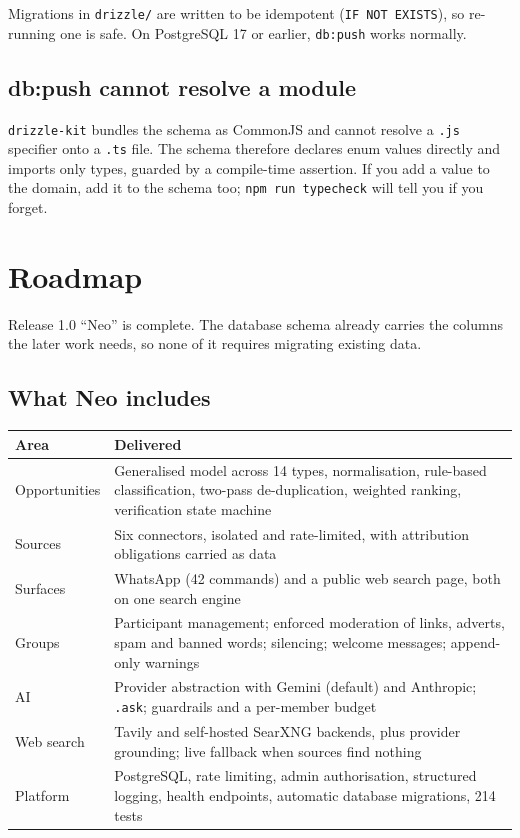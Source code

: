 \documentclass[11pt,a4paper]{report}
\begin{document}
Migrations in \texttt{drizzle/} are written to be idempotent
(\texttt{IF NOT EXISTS}), so re-running one is safe. On PostgreSQL 17 or
earlier, \texttt{db:push} works normally.

\section*{db:push cannot resolve a module}

\texttt{drizzle-kit} bundles the schema as CommonJS and cannot resolve a
\texttt{.js} specifier onto a \texttt{.ts} file. The schema therefore declares
enum values directly and imports only types, guarded by a compile-time
assertion. If you add a value to the domain, add it to the schema too;
\texttt{npm run typecheck} will tell you if you forget.

\chapter{Roadmap}
\label{ch:roadmap}

Release 1.0 ``Neo'' is complete. The database schema already carries the
columns the later work needs, so none of it requires migrating existing data.

\section{What Neo includes}

\begin{center}
\begin{tabularx}{\textwidth}{@{}lX@{}}
\toprule
\textbf{Area} & \textbf{Delivered} \\
\midrule
Opportunities & Generalised model across 14 types, normalisation,
rule-based classification, two-pass de-duplication, weighted ranking,
verification state machine \\
Sources & Six connectors, isolated and rate-limited, with attribution
obligations carried as data \\
Surfaces & WhatsApp (42 commands) and a public web search page, both on one
search engine \\
Groups & Participant management; enforced moderation of links, adverts, spam
and banned words; silencing; welcome messages; append-only warnings \\
AI & Provider abstraction with Gemini (default) and Anthropic; \texttt{.ask};
guardrails and a per-member budget \\
Web search & Tavily and self-hosted SearXNG backends, plus provider grounding;
live fallback when sources find nothing \\
Platform & PostgreSQL, rate limiting, admin authorisation, structured logging,
health endpoints, automatic database migrations, 214 tests \\
\bottomrule
\end{tabularx}
\end{center}
\end{document}
